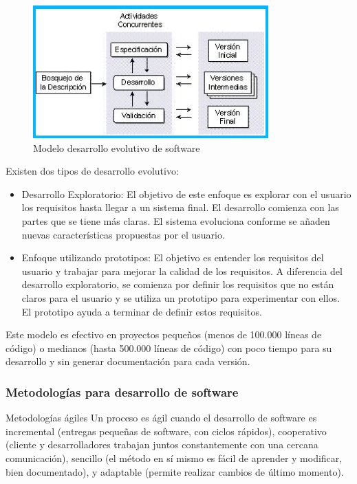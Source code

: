 \documentclass[
]{article}
\providecommand{\tightlist}{%
  \setlength{\itemsep}{0pt}\setlength{\parskip}{0pt}}
\begin{document}
\begin{figure}

{\centering \includegraphics[width=0.5\linewidth]{marco teorico/Screenshot from 2021-11-09 04-24-09} 

}

\caption{Modelo desarrollo evolutivo de software}\label{fig:unnamed-chunk-6}
\end{figure}

Existen dos tipos de desarrollo evolutivo:

\begin{itemize}
\tightlist
\item
  Desarrollo Exploratorio: El objetivo de este enfoque es explorar con
  el usuario los requisitos hasta llegar a un sistema final. El
  desarrollo comienza con las partes que se tiene más claras. El sistema
  evoluciona conforme se añaden nuevas características propuestas por el
  usuario.
\item
  Enfoque utilizando prototipos: El objetivo es entender los requisitos
  del usuario y trabajar para mejorar la calidad de los requisitos. A
  diferencia del desarrollo exploratorio, se comienza por definir los
  requisitos que no están claros para el usuario y se utiliza un
  prototipo para experimentar con ellos. El prototipo ayuda a terminar
  de definir estos requisitos.
\end{itemize}

Este modelo es efectivo en proyectos pequeños (menos de 100.000 líneas
de código) o medianos (hasta 500.000 líneas de código) con poco tiempo
para su desarrollo y sin generar documentación para cada versión.

\hypertarget{metodologuxedas-para-desarrollo-de-software}{%
\subsubsection{Metodologías para desarrollo de
software}\label{metodologuxedas-para-desarrollo-de-software}}

Metodologías ágiles Un proceso es ágil cuando el desarrollo de software
es incremental (entregas pequeñas de software, con ciclos rápidos),
cooperativo (cliente y desarrolladores trabajan juntos constantemente
con una cercana comunicación), sencillo (el método en sí mismo es fácil
de aprender y modificar, bien documentado), y adaptable (permite
realizar cambios de último momento).
\end{document}

